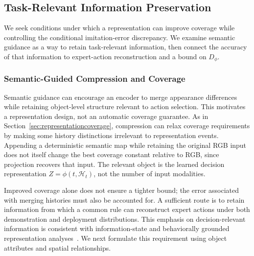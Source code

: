 \subsection{Task-Relevant Information Preservation}
\label{sec:representationanalysis}
We seek conditions under which a representation can improve coverage while controlling the conditional imitation-error discrepancy.
We examine semantic guidance as a way to retain task-relevant information, then connect the accuracy of that information to expert-action reconstruction and a bound on $D_\phi$.

\subsubsection{Semantic-Guided Compression and Coverage}
Semantic guidance can encourage an encoder to merge appearance differences while retaining object-level structure relevant to action selection.
This motivates a representation design, not an automatic coverage guarantee.
As in Section~\ref{sec:representationcoverage}, compression can relax coverage requirements by making some history distinctions irrelevant to representation events.
Appending a deterministic semantic map while retaining the original RGB input does not itself change the best coverage constant relative to RGB, since projection recovers that input.
The relevant object is the learned decision representation $Z=\phi(t,\mathcal H_t)$, not the number of input modalities.

Improved coverage alone does not ensure a tighter bound; the error associated with merging histories must also be accounted for.
A sufficient route is to retain information from which a common rule can reconstruct expert actions under both demonstration and deployment distributions.
This emphasis on decision-relevant information is consistent with information-state and behaviorally grounded representation analyses~\cite{subramanian2022ais,zhang2021dbc}.
We next formulate this requirement using object attributes and spatial relationships.

